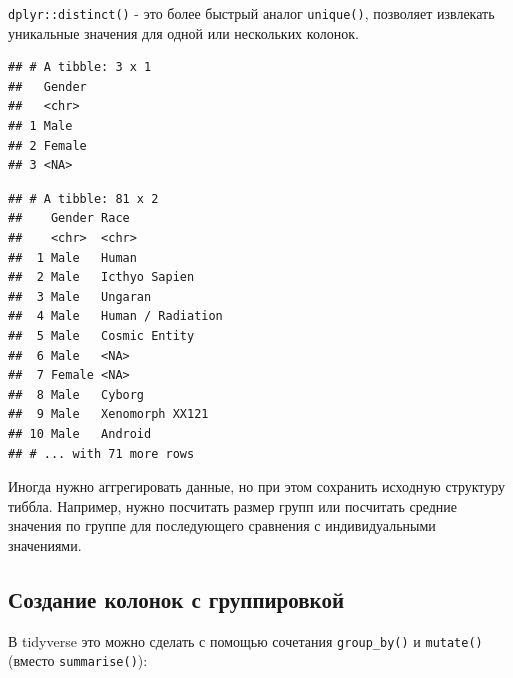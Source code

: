 \documentclass[
]{book}
\newenvironment{Shaded}{\begin{snugshade}}{\end{snugshade}}
\newcommand{\DataTypeTok}[1]{\textcolor[rgb]{0.13,0.29,0.53}{#1}}
\newcommand{\KeywordTok}[1]{\textcolor[rgb]{0.13,0.29,0.53}{\textbf{#1}}}
\newcommand{\NormalTok}[1]{#1}
\newcommand{\OperatorTok}[1]{\textcolor[rgb]{0.81,0.36,0.00}{\textbf{#1}}}
\newcommand{\StringTok}[1]{\textcolor[rgb]{0.31,0.60,0.02}{#1}}
\begin{document}
\texttt{dplyr::distinct()} - это более быстрый аналог \texttt{unique()}, позволяет извлекать уникальные значения для одной или нескольких колонок.

\begin{Shaded}
\end{Shaded}

\begin{verbatim}
## # A tibble: 3 x 1
##   Gender
##   <chr> 
## 1 Male  
## 2 Female
## 3 <NA>
\end{verbatim}

\begin{Shaded}
\end{Shaded}

\begin{verbatim}
## # A tibble: 81 x 2
##    Gender Race             
##    <chr>  <chr>            
##  1 Male   Human            
##  2 Male   Icthyo Sapien    
##  3 Male   Ungaran          
##  4 Male   Human / Radiation
##  5 Male   Cosmic Entity    
##  6 Male   <NA>             
##  7 Female <NA>             
##  8 Male   Cyborg           
##  9 Male   Xenomorph XX121  
## 10 Male   Android          
## # ... with 71 more rows
\end{verbatim}

Иногда нужно аггрегировать данные, но при этом сохранить исходную структуру тиббла. Например, нужно посчитать размер групп или посчитать средние значения по группе для последующего сравнения с индивидуальными значениями.

\hypertarget{tidy_group_mutate}{%
\subsection{Создание колонок с группировкой}\label{tidy_group_mutate}}

В tidyverse это можно сделать с помощью сочетания \texttt{group\_by()} и \texttt{mutate()} (вместо \texttt{summarise()}):

\begin{Shaded}
\end{Shaded}
\end{document}
